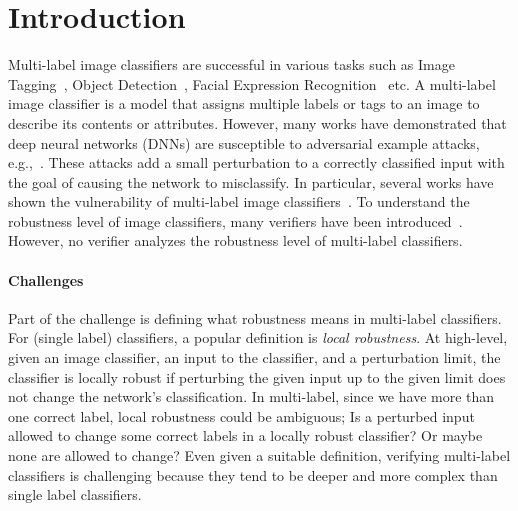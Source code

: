 
\section{Introduction}

Multi-label image classifiers are successful in various tasks such as Image Tagging~\cite{IMAGETAGGING}, Object Detection~\cite{ObjectDetection}, Facial Expression Recognition~\cite{FacialRec} etc.
A multi-label image classifier is a model that assigns multiple labels or tags to an image to describe its contents or attributes.
However, many works have demonstrated that deep neural networks (DNNs) are susceptible to adversarial example attacks, e.g.,~\cite{ref7,ref15,szegedy2014intriguing,ref17,ref29,ref56}.
These attacks add a small perturbation to a correctly classified input with the goal of causing the network to misclassify.
In particular, several works have shown the vulnerability of multi-label image classifiers~\cite{MultiVul1, MultiVul2, MultiVul3}.
To understand the robustness level of image classifiers, many verifiers have been introduced~\cite{MIPVERIFY, INCOMPLETE1, INCOMPLETE2, COMPLETE, ABSTRACTINTER}.
However, no verifier analyzes the robustness level of multi-label classifiers. %

\paragraph{Challenges} Part of the challenge is defining what robustness means in multi-label classifiers.
For (single label) classifiers, a popular definition is \emph{local robustness}.
At high-level, given an image classifier, an input to the classifier, and a perturbation limit, the classifier is locally robust if perturbing the given input up to the given limit does not change the network's classification.
In multi-label, since we have more than one correct label, local robustness could be ambiguous;
Is a perturbed input allowed to change some correct labels in a locally robust classifier?
Or maybe none are allowed to change?
Even given a suitable definition, verifying multi-label classifiers is challenging because they tend to be deeper and more complex than single label classifiers.

